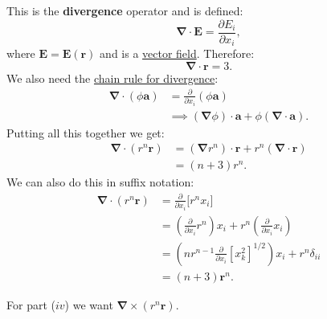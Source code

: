 \begin{enumerate}
    This is the \textbf{divergence} operator and is defined:
    $$\boldsymbol{\nabla}\cdot\boldsymbol{E}
    =\frac{\partial E_i}{\partial x_i},$$
    where $\boldsymbol{E}=\boldsymbol{E}(\boldsymbol{r})$ and is a \underline{vector field}. Therefore:
    $$\boldsymbol{\nabla}\cdot\boldsymbol{r}=3.$$
    We also need the \underline{chain rule for divergence}:
    \begin{align*}
        \boldsymbol{\nabla}\cdot(\phi\boldsymbol{a})
        &= \frac{\partial}{\partial x_i}(\phi\boldsymbol{a}) \\
        &\implies (\boldsymbol{\nabla}\phi)\cdot\boldsymbol{a}
        +\phi(\boldsymbol{\nabla}\cdot\boldsymbol{a}).
    \end{align*}
    Putting all this together we get:
    \begin{align*}
        \boldsymbol{\nabla}\cdot(r^n\boldsymbol{r})
        &= (\boldsymbol{\nabla}r^n)\cdot\boldsymbol{r}
        +r^n(\boldsymbol{\nabla}\cdot\boldsymbol{r}) \\
        &= (n+3)r^n.
    \end{align*}
    We can also do this in suffix notation:
    \begin{align*}
        \boldsymbol{\nabla}\cdot(r^n\boldsymbol{r})
        &=\frac{\partial}{\partial x_i}\bigl[r^n x_i\bigr] \\
        &=\left(\frac{\partial}{\partial x_i} r^n\right)x_i
        +r^n\left(\frac{\partial}{\partial x_i}x_i\right) \\
        &=\left(nr^{n-1}\frac{\partial}{\partial x_i}[x_k^2]^{1/2}\right)x_i
        +r^n\delta_{ii} \\
        &=(n+3)\boldsymbol{r}^n.
    \end{align*}
    
    \newpage

    For part ($iv$) we want $\boldsymbol{\nabla}\times
    (r^n\boldsymbol{r})$.


\end{enumerate}
